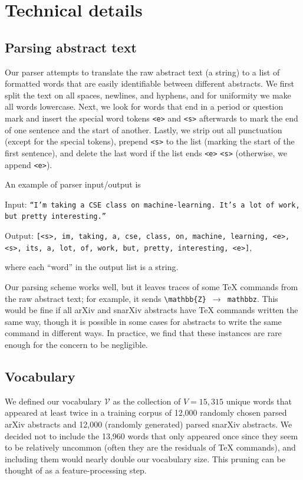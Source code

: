 \documentclass{article}
\newcommand{\V}{\mathcal{V}}
\begin{document}
\appendix
\section{Technical details} \label{app:details}
\subsection{Parsing abstract text} \label{app:parsing}
Our parser attempts to translate the raw abstract text (a string) to a list of formatted words that are easily identifiable between different abstracts.
We first split the text on all spaces, newlines, and hyphens, and for uniformity we make all words lowercase.
Next, we look for words that end in a period or question mark and insert the special word tokens \texttt{<e>} and \texttt{<s>} afterwards to mark the end of one sentence and the start of another.
Lastly, we strip out all punctuation (except for the special tokens), prepend \texttt{<s>} to the list (marking the start of the first sentence), and delete the last word if the list ends \texttt{<e>} \texttt{<s>} (otherwise, we append \texttt{<e>}).

An example of parser input/output is

Input: \texttt{``I'm taking a CSE class on machine-learning.\ It's a lot of work, but pretty interesting.''}

Output: \texttt{[<s>, im, taking, a, cse, class, on, machine, learning, <e>, <s>, its, a, lot, of, work, but, pretty, interesting, <e>]}, 

where each ``word'' in the output list is a string.

Our parsing scheme works well, but it leaves traces of some TeX commands from the raw abstract text; for example, it sends \texttt{\textbackslash mathbb\{Z\} $\to$ mathbbz}.
This would be fine if all arXiv and snarXiv abstracts have TeX commands written the same way, though it is possible in some cases for abstracts to write the same command in different ways. In practice, we find that these instances are rare enough for the concern to be negligible.


\subsection{Vocabulary}
We defined our vocabulary $\V$ as the collection of $V=15,315$ unique words that appeared at least twice in a training corpus of 12,000 randomly chosen parsed arXiv abstracts and 12,000 (randomly generated) parsed snarXiv abstracts.
We decided not to include the 13,960 words that only appeared once since they seem to be relatively uncommon (often they are the residuals of TeX commands), and including them would nearly double our vocabulary size.
This pruning can be thought of as a feature-processing step.
\end{document}
